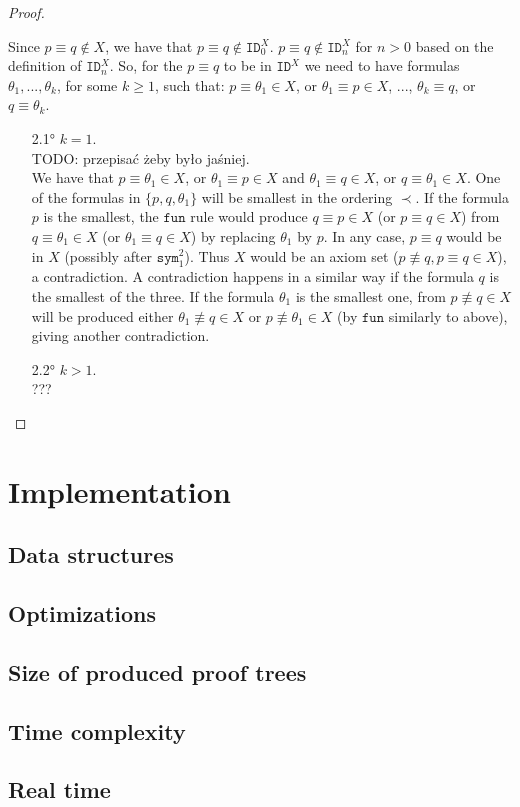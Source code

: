 \documentclass{article}
\theoremstyle{definition}
\newcommand*{\id}{\equiv}
\newcommand*{\IDx}{\texttt{ID}^X}
\begin{document}
\begin{proof}
\begin{itemize}
              Since $p \id q \not \in X$, we have that $p \id q \not \in \IDx_0$. $p \id q \not \in \IDx_n$ for $n > 0$ based on the definition of $\IDx_n$. So, for the $p \id q$ to be in $\IDx$ we need to have formulas $\theta_1, ..., \theta_k$, for some $k \geq 1$, such that: $p \id \theta_1 \in X$, or $\theta_1 \id p \in X$, ..., $\theta_k \id q$, or $q \id \theta_k$.
              \begin{itemize}
                  \item [2.1°] $k = 1$.\\
                        TODO: przepisać żeby było jaśniej.\\
                        We have that $p \id \theta_1 \in X$, or $\theta_1 \id p \in X$ and $\theta_1 \id q \in X$, or $q \id \theta_1 \in X$. One of the formulas in $\{p, q, \theta_1\}$ will be smallest in the ordering $\prec$. If the formula $p$ is the smallest, the $\texttt{fun}$ rule would produce $q \id p \in X$ (or $p \id q \in X$) from $q \id \theta_1 \in X$ (or $\theta_1 \id q \in X$) by replacing $\theta_1$ by $p$. In any case, $p \id q$ would be in $X$ (possibly after $\texttt{sym}^2_1$). Thus $X$ would be an axiom set ($p\not \id q, p \id q \in X$), a contradiction. A contradiction happens in a similar way if the formula $q$ is the smallest of the three. If the formula $\theta_1$ is the smallest one, from $p \not \id q \in X$ will be produced either $\theta_1 \not \id q \in X$ or $p \not \id \theta_1 \in X$ (by $\texttt{fun}$ similarly to above), giving another contradiction.
                  \item [2.2°] $k > 1$.\\
                        ???
              \end{itemize}
    \end{itemize}
\end{proof}


\section{Implementation}
\subsection{Data structures}
\subsection{Optimizations}
\subsection{Size of produced proof trees}
\subsection{Time complexity}
\subsection{Real time}
\end{document}
